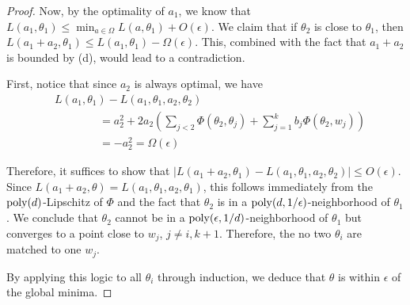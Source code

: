 \documentclass{article}
\begin{document}
\begin{proof}
Now, by the optimality of $a_1$, we know that $L(a_1,\theta_1) \leq \min_{a \in \Omega} L(a,\theta_1) + O(\epsilon)$. We claim that if $\theta_2$ is close to $\theta_1$, then $L(a_1+a_2,\theta_1) \leq L(a_1,\theta_1) - \Omega(\epsilon)$. This, combined with the fact that $a_1 + a_2$ is bounded by \poly(d), would lead to a contradiction.

First, notice that since $a_2$ is always optimal, we have
\begin{align*}
& L(a_1,\theta_1) - L(a_1,\theta_1,a_2,\theta_2) \\
& \qquad \qquad = a_2^2 + 2a_2 (\sum_{j < 2} \Phi(\theta_2,\theta_j) + \sum_{j=1}^k b_j \Phi(\theta_2,w_j)) \\
& \qquad \qquad = -a_2^2 = \Omega(\epsilon)
\end{align*}

Therefore, it suffices to show that $|L(a_1+a_2,\theta_1) - L(a_1,\theta_1,a_2,\theta_2) | \leq O(\epsilon)$. Since $L(a_1+a_2,\theta) = L(a_1,\theta_1,a_2,\theta_1)$, this follows immediately from the $\mathrm{poly}(d)$-Lipschitz of $\Phi$ and the fact that $\theta_2$ is in a $\mathrm{poly}(d,1/\epsilon)$-neighborhood of $\theta_1$. We conclude that $\theta_2$ cannot be in a $\mathrm{poly}(\epsilon,1/d)$-neighborhood of $\theta_1$ but converges to a point close to $w_{j}$, $j\neq i,k+1$. Therefore, the no two $\theta_i$ are matched to one $w_j$. 

By applying this logic to all $\theta_i$ through induction, we deduce that $\theta$ is within $\epsilon$ of the global minima.
\end{proof}
\fi
\end{document}
